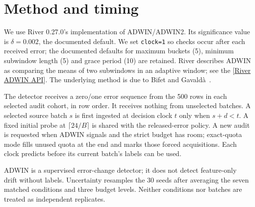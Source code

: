 \documentclass[10pt]{article}
\title{\textcolor{navy}{A Stronger Drift Baseline}\[3pt]
\large ADWIN with Delayed, Budgeted Prediction-Error Feedback}
\author{23I-2581 and 23I-2604\\Data Analysis and Visualization --- Phase 3 addendum}
\date{17 November 2026}
\begin{document}
\maketitle
\begin{abstract}
We add River's canonical ADWIN detector as a supervised baseline on the exact same frozen predictions, 30 evaluation seeds, seven synthetic conditions, audit cohorts, budgets and label delays used in the policy matrix. ADWIN receives row-level binary prediction errors only from sampled cohorts after their labels are released. The comparison demonstrates that detector choice is constrained by the feedback schedule: under strict caps, a single bootstrap cohort supplies no second labeled sample from which to detect a change. This is a scoped baseline evaluation, not a claim of ADWIN's general performance.
\end{abstract}
\section{Method and timing}
We use River 0.27.0's implementation of ADWIN/ADWIN2. Its significance value is $\delta=0.002$, the documented default. We set \texttt{clock=1} so checks occur after each received error; the documented defaults for maximum buckets (5), minimum subwindow length (5) and grace period (10) are retained. River describes ADWIN as comparing the means of two subwindows in an adaptive window; see the [\href{https://riverml.xyz/latest/api/drift/ADWIN/}{River ADWIN API}]. The underlying method is due to Bifet and Gavald\`a~\cite{bifet2007}.

The detector receives a zero/one error sequence from the 500 rows in each selected audit cohort, in row order. It receives nothing from unselected batches. A selected source batch $s$ is first ingested at decision clock $t$ only when $s+d<t$. A fixed initial probe at $\lceil24/B\rceil$ is shared with the released-error policy. A new audit is requested when ADWIN signals and the strict budget has room; exact-quota mode fills unused quota at the end and marks those forced acquisitions. Each clock predicts before its current batch's labels can be used.

ADWIN is a supervised error-change detector; it does not detect feature-only drift without labels. Uncertainty resamples the 30 seeds after averaging the seven matched conditions and three budget levels. Neither conditions nor batches are treated as independent replicates.
\end{document}
